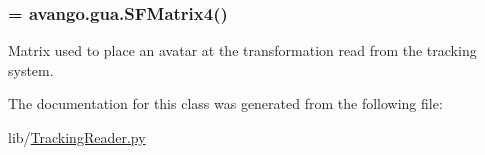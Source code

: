 \hypertarget{classlib_1_1TrackingReader_1_1TrackingReader_a9e0431893dd2af4d1a9da802b1f4bdaa}{
\subsubsection[{sf\-\_\-avatar\-\_\-body\-\_\-mat}]{ = avango.\-gua.\-S\-F\-Matrix4()}}\label{classlib_1_1TrackingReader_1_1TrackingReader_a9e0431893dd2af4d1a9da802b1f4bdaa}


\-Matrix used to place an avatar at the transformation read from the tracking system. 



\-The documentation for this class was generated from the following file\-:\begin{DoxyCompactItemize}
\item 
lib/\hyperlink{TrackingReader_8py}{\-Tracking\-Reader.\-py}\end{DoxyCompactItemize}
